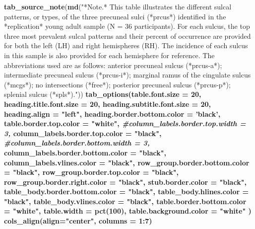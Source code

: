 \documentclass[
]{article}
\newenvironment{Shaded}{\begin{snugshade}}{\end{snugshade}}
\newcommand{\CommentTok}[1]{\textcolor[rgb]{0.56,0.35,0.01}{\textit{#1}}}
\newcommand{\DataTypeTok}[1]{\textcolor[rgb]{0.13,0.29,0.53}{#1}}
\newcommand{\DecValTok}[1]{\textcolor[rgb]{0.00,0.00,0.81}{#1}}
\newcommand{\KeywordTok}[1]{\textcolor[rgb]{0.13,0.29,0.53}{\textbf{#1}}}
\newcommand{\NormalTok}[1]{#1}
\newcommand{\OperatorTok}[1]{\textcolor[rgb]{0.81,0.36,0.00}{\textbf{#1}}}
\newcommand{\StringTok}[1]{\textcolor[rgb]{0.31,0.60,0.02}{#1}}
\begin{document}
\begin{Shaded}
\begin{Highlighting}[]
{{{{{{{{{\KeywordTok{tab_source_note}\NormalTok{(}\KeywordTok{md}\NormalTok{(}\StringTok{"*Note.* This table illustrates the different sulcal patterns, or types, of the three precuneal sulci (*prcus*) identified in the *replication* young adult sample (N = 36 participants). For each sulcus, the top three most prevalent sulcal patterns and their percent of occurrence are provided for both the left (LH) and right hemispheres (RH). The incidence of each sulcus in this sample is also provided for each hemisphere for reference. The abbreviations used are as follows: anterior precuneal sulcus (*prcus-a*); intermediate precuneal sulcus (*prcus-i*); marginal ramus of the cingulate sulcus (*mcgs*); no intersections (*free*); posterior precuneal sulcus (*prcus-p*); splenial sulcus (*spls*)."}\NormalTok{)) }\OperatorTok{%>%}
\StringTok{  }\KeywordTok{tab_options}\NormalTok{(}\DataTypeTok{table.font.size =} \DecValTok{20}\NormalTok{,}
    \DataTypeTok{heading.title.font.size =} \DecValTok{20}\NormalTok{,}
    \DataTypeTok{heading.subtitle.font.size =} \DecValTok{20}\NormalTok{,}
    \DataTypeTok{heading.align =} \StringTok{"left"}\NormalTok{,}
    \DataTypeTok{heading.border.bottom.color =} \StringTok{'black'}\NormalTok{,}
    \DataTypeTok{table.border.top.color =} \StringTok{"white"}\NormalTok{,}
    \CommentTok{#column_labels.border.top.width = 3,}
    \DataTypeTok{column_labels.border.top.color =} \StringTok{"black"}\NormalTok{,}
    \CommentTok{#column_labels.border.bottom.width = 3,}
    \DataTypeTok{column_labels.border.bottom.color =} \StringTok{"black"}\NormalTok{,}
    \DataTypeTok{column_labels.vlines.color =} \StringTok{"black"}\NormalTok{,}
    \DataTypeTok{row_group.border.bottom.color =} \StringTok{"black"}\NormalTok{,}
    \DataTypeTok{row_group.border.top.color =} \StringTok{"black"}\NormalTok{,}
    \DataTypeTok{row_group.border.right.color =} \StringTok{"black"}\NormalTok{,}
    \DataTypeTok{stub.border.color =} \StringTok{"black"}\NormalTok{,}
    \DataTypeTok{table_body.border.bottom.color =} \StringTok{"black"}\NormalTok{,}
    \DataTypeTok{table_body.hlines.color =} \StringTok{"black"}\NormalTok{,}
    \DataTypeTok{table_body.vlines.color =} \StringTok{"black"}\NormalTok{,}
    \DataTypeTok{table.border.bottom.color =} \StringTok{"white"}\NormalTok{,}
    \DataTypeTok{table.width =} \KeywordTok{pct}\NormalTok{(}\DecValTok{100}\NormalTok{),}
    \DataTypeTok{table.background.color =} \StringTok{"white"}
\NormalTok{  ) }\OperatorTok{%>%}
\StringTok{  }\KeywordTok{cols_align}\NormalTok{(}\DataTypeTok{align=}\StringTok{"center"}\NormalTok{, }\DataTypeTok{columns =} \DecValTok{1}\OperatorTok{:}\DecValTok{7}\NormalTok{) }\OperatorTok{%>%}
}}}}}}}}}}}}
\end{Highlighting}
\end{Shaded}
\end{document}

